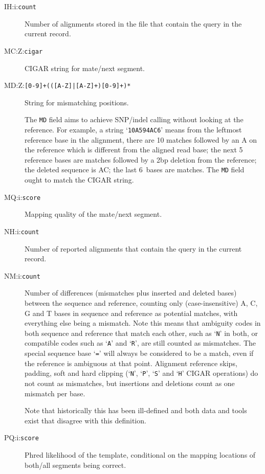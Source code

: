 \documentclass[10pt]{article}
\newcommand{\tagvalue}[1]{{\tt #1}}
\newcommand{\tagregex}[1]{{\tt #1}}
\begin{document}
\begin{description}
\item[IH:i:\tagvalue{count}]
Number of alignments stored in the file that contain the query in the current
record.

\item[MC:Z:\tagvalue{cigar}]
CIGAR string for mate/next segment.

\item[MD:Z:\tagregex{[0-9]+(([A-Z]|[A-Z]+)[0-9]+)*}]
String for mismatching positions.

The {\tt MD} field aims to achieve SNP/indel calling without
looking at the reference. For example, a string `{\tt 10A5\char94AC6}' means
from the leftmost reference base in the alignment, there are 10 matches
followed by an A on the reference which is different from the aligned read
base; the next 5 reference bases are matches followed by a 2bp deletion from
the reference; the deleted sequence is AC; the last 6~bases are matches.
The {\tt MD} field ought to match the {\sf CIGAR} string.

\item[MQ:i:\tagvalue{score}]
Mapping quality of the mate/next segment.

\item[NH:i:\tagvalue{count}]
Number of reported alignments that contain the query in the current record.

\item[NM:i:\tagvalue{count}]
Number of differences (mismatches plus inserted and deleted bases) between the sequence and reference, counting only (case-insensitive) A, C, G and T bases in sequence and reference as potential matches, with everything else being a mismatch.
Note this means that ambiguity codes in both sequence and reference that match each other, such as `{\tt N}' in both, or compatible codes such as `{\tt A}' and `{\tt R}', are still counted as mismatches.
The special sequence base `{\tt =}' will always be considered to be a match, even if the reference is ambiguous at that point.
Alignment reference skips, padding, soft and hard clipping (`{\tt N}', `{\tt P}', `{\tt S}' and `{\tt H}' {\sf CIGAR} operations) do not count as mismatches, but insertions and deletions count as one mismatch per base.

Note that historically this has been ill-defined and both data and tools exist that disagree with this definition.

\item[PQ:i:\tagvalue{score}]
Phred likelihood of the template, conditional on the mapping locations of both/all segments being correct.


\end{description}
\end{document}
